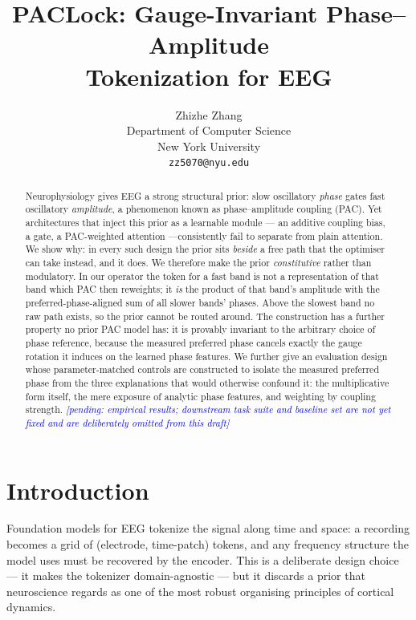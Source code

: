 \documentclass{article}
\title{{\sc PACLock}: Gauge-Invariant Phase--Amplitude\\
Tokenization for EEG}
\author{Zhizhe Zhang \\
Department of Computer Science \\
New York University \\
\texttt{zz5070@nyu.edu}}
\newcommand{\pending}[1]{\textcolor{blue}{\textit{[pending: #1]}}}
\begin{document}
\maketitle

\begin{abstract}
Neurophysiology gives EEG a strong structural prior: slow oscillatory
\emph{phase} gates fast oscillatory \emph{amplitude}, a phenomenon known as
phase--amplitude coupling (PAC). Yet architectures that inject this prior as a
learnable module --- an additive coupling bias, a gate, a PAC-weighted attention
---consistently fail to separate from plain attention. We show why: in every such
design the prior sits \emph{beside} a free path that the optimiser can take
instead, and it does. We therefore make the prior \emph{constitutive} rather than
modulatory. In our operator the token for a fast band is not a representation of
that band which PAC then reweights; it \emph{is} the product of that band's
amplitude with the preferred-phase-aligned sum of all slower bands' phases. Above
the slowest band no raw path exists, so the prior cannot be routed around. The
construction has a further property no prior PAC model has: it is provably
invariant to the arbitrary choice of phase reference, because the measured
preferred phase cancels exactly the gauge rotation it induces on the learned
phase features. We further give an evaluation design whose parameter-matched
controls are constructed to isolate the measured preferred phase from the three
explanations that would otherwise confound it: the multiplicative form itself,
the mere exposure of analytic phase features, and weighting by coupling strength.
\pending{empirical results; downstream task suite and baseline set are not yet
fixed and are deliberately omitted from this draft}
\end{abstract}

\section{Introduction}

Foundation models for EEG \citep{yang2023biot,jiang2024labram,wang2025cbramod}
tokenize the signal along time and space: a recording becomes a grid of
(electrode, time-patch) tokens, and any frequency structure the model uses must
be recovered by the encoder. This is a deliberate design choice --- it makes the
tokenizer domain-agnostic --- but it discards a prior that neuroscience regards
as one of the most robust organising principles of cortical dynamics.
\end{document}
